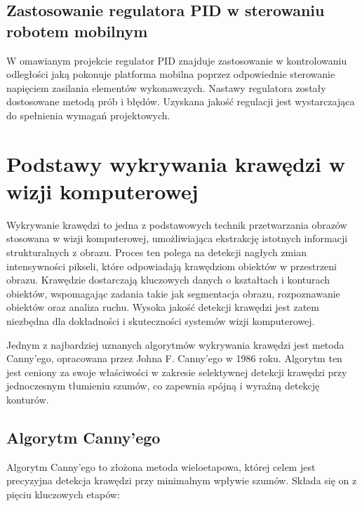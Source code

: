 \subsection{Zastosowanie regulatora PID w sterowaniu robotem mobilnym}

W omawianym projekcie regulator PID znajduje zastosowanie w kontrolowaniu odległości jaką pokonuje platforma mobilna poprzez odpowiednie sterowanie napięciem zasilania elementów wykonawczych. Nastawy regulatora zostały dostosowane metodą prób i błędów. Uzyskana jakość regulacji jest wystarczająca do spełnienia wymagań projektowych. 

\clearpage

\section{Podstawy wykrywania krawędzi w wizji komputerowej}

Wykrywanie krawędzi to jedna z podstawowych technik przetwarzania obrazów stosowana w wizji komputerowej, umożliwiająca ekstrakcję istotnych informacji strukturalnych z obrazu. Proces ten polega na detekcji nagłych zmian intensywności pikseli, które odpowiadają krawędziom obiektów w przestrzeni obrazu. Krawędzie dostarczają kluczowych danych o kształtach i konturach obiektów, wspomagając zadania takie jak segmentacja obrazu, rozpoznawanie obiektów oraz analiza ruchu. Wysoka jakość detekcji krawędzi jest zatem niezbędna dla dokładności i skuteczności systemów wizji komputerowej.

Jednym z najbardziej uznanych algorytmów wykrywania krawędzi jest metoda Canny'ego, opracowana przez Johna F. Canny’ego w 1986 roku. Algorytm ten jest ceniony za swoje właściwości w zakresie selektywnej detekcji krawędzi przy jednoczesnym tłumieniu szumów, co zapewnia spójną i wyraźną detekcję konturów.

\subsection{Algorytm Canny’ego}

Algorytm Canny’ego \cite{bib:canny-article} to złożona metoda wieloetapowa, której celem jest precyzyjna detekcja krawędzi przy minimalnym wpływie szumów. Składa się on z pięciu kluczowych etapów:

